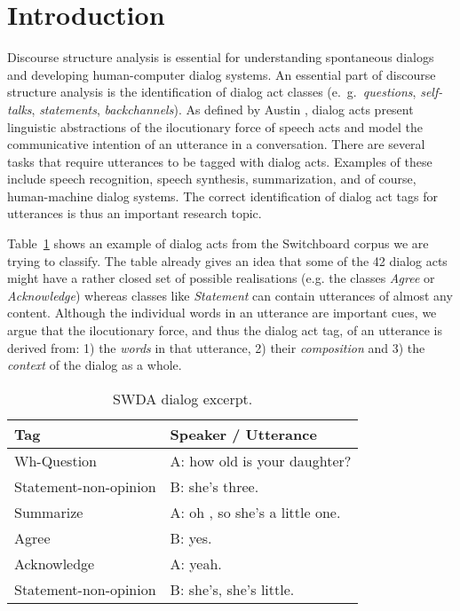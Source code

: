\section{Introduction}\label{sec:intro}
Discourse structure analysis is essential for understanding spontaneous dialogs and developing human-computer dialog systems.
An essential part of discourse structure analysis is the identification of dialog act classes (e.\ g.\ \emph{questions}, \emph{self-talks}, \emph{statements}, \emph{backchannels}).
As defined by Austin , dialog acts present linguistic abstractions of the ilocutionary force of speech acts and model the communicative intention of an utterance in a conversation.
There are several tasks that require utterances to be tagged with dialog acts.
Examples of these include speech recognition, speech synthesis, summarization, and of course, human-machine dialog systems.
The correct identification of dialog act tags for utterances is thus an important research topic.


Table~\ref{tab:swda_example} shows an example of dialog acts from the Switchboard corpus we are trying to classify.
The table already gives an idea that some of the 42 dialog acts might have a rather closed set of possible realisations (e.g. the classes \emph{Agree} or \emph{Acknowledge}) whereas classes like \emph{Statement} can contain utterances of almost any content.
Although the individual words in an utterance are important cues, we argue that the ilocutionary force, and thus the dialog act tag, of an utterance is derived from: 1) the \emph{words} in that utterance, 2) their \emph{composition} and 3) the \emph{context} of the dialog as a whole. 



\begin{table}[h]
\centering
\small
\begin{tabular}{ll}
\hline
\textbf{Tag} & \textbf{Speaker / Utterance}
\\
\hline
Wh-Question & A: how old is your daughter?\\
Statement-non-opinion & B: she's three.\\
Summarize & A: oh , so she's a little one.\\
Agree & B: yes.\\
Acknowledge & A: yeah.\\
Statement-non-opinion & B: she's, she's little.\\
\hline
\end{tabular}
\caption{SWDA dialog excerpt.}
\label{tab:swda_example}
\end{table}

